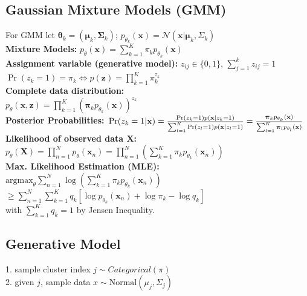 \documentclass[9pt,parskip]{scrartcl}
\begin{document}
\begin{multicols*}{4}
\subsection*{Gaussian Mixture Models (GMM)}
For GMM let $\boldsymbol{\theta}_k = (\boldsymbol{\mu}_k, \boldsymbol{\Sigma}_k)$; $p_{\theta_k}(\mathbf{x}) = \mathcal{N}(\mathbf{x} | \boldsymbol{\mu}_k, \Sigma_k)$\\
\textbf{Mixture Models:} $p_\theta(\mathbf{x}) = \sum_{k=1}^K \pi_k p_{\theta_k}(\mathbf{x})$\\
\textbf{Assignment variable (generative model):} $z_{ij} \in \{0, 1\}$, $\sum_{j=1}^k z_{ij} = 1$\\
$\operatorname{Pr}(z_k = 1) = \pi_k \Leftrightarrow p(\mathbf{z}) = \prod_{k=1}^K \pi_k^{z_k}$\\
\textbf{Complete data distribution:}\\
$p_\theta(\mathbf{x}, \mathbf{z}) = \prod_{k=1}^K \left( \boldsymbol{\pi}_k p_{\theta_k}(\mathbf{x})\right)^{z_k}$\\
\textbf{Posterior Probabilities:} $\\\operatorname{Pr}(z_k = 1 | \mathbf{x}) = \frac{\operatorname{Pr}(z_k = 1) p(\mathbf{x} | z_k = 1)}{\sum_{l=1}^K \operatorname{Pr}(z_l = 1) p(\mathbf{x} | z_l = 1)} = \frac{\boldsymbol{\pi}_k p_{\theta_k}(\mathbf{x})}{\sum_{l=1}^K \boldsymbol{\pi}_l p_{\theta_l}(\mathbf{x})}$
\textbf{Likelihood of observed data $\mathbf{X}$:}\\
$p_\theta(\mathbf{X}) = \prod_{n=1}^N p_\theta(\mathbf{x}_n) = \prod_{n=1}^N \left(\sum_{k=1}^K \pi_k p_{\theta_k}(\mathbf{x}_n)\right)$ \\
\textbf{Max. Likelihood Estimation (MLE):}\\
$\text{argmax}_{\theta}\sum_{n=1}^N \log \left( \sum_{k=1}^K \pi_k p_{\theta_k}(\mathbf{x}_n)\right)$ \\
$\ge \sum_{n=1}^N \sum_{k=1}^K{q_k[\log p_{\theta_k}(\mathbf{x}_n) + \log \pi_k - \log q_k]}$\\
with $\sum_{k=1}^K{q_k} = 1$ by Jensen Inequality.

\subsection*{Generative Model}
1. sample cluster index $j \sim Categorical(\pi)$\\
2. given $j$, sample data $x \sim \text{Normal}(\mu_j, \Sigma_j)$



\end{multicols*}
\end{document}
